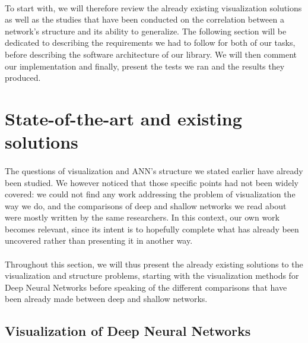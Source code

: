 \documentclass[a4paper]{article}
\begin{document}
\paragraph{}To start with, we will therefore review the already existing visualization solutions as well as the studies that have been conducted on the correlation between a network's structure and its ability to generalize. The following section will be dedicated to describing the requirements we had to follow for both of our tasks, before describing the software architecture of our library. We will then comment our implementation and finally, present the tests we ran and the results they produced.




\section{State-of-the-art and existing solutions}

\paragraph{}The questions of visualization and ANN's structure we stated earlier have already been studied. We however noticed that those specific points had not been widely covered: we could not find any work addressing the problem of visualization the way we do, and the comparisons of deep and shallow networks we read about were mostly written by the same researchers. In this context, our own work becomes relevant, since its intent is to hopefully complete what has already been uncovered rather than presenting it in another way.

\paragraph{}Throughout this section, we will thus present the already existing solutions to the visualization and structure problems, starting with the visualization methods for Deep Neural Networks before speaking of the different comparisons that have been already made between deep and shallow networks.  


\subsection{Visualization of Deep Neural Networks}
\end{document}
